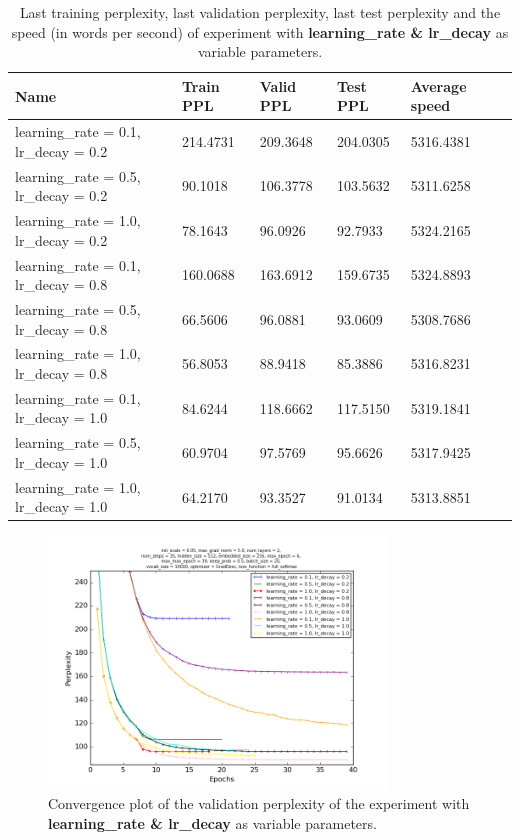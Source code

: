 \documentclass[10pt,a4paper,titlepage]{article}
\begin{document}
\begin{table}[H]
\centering
\caption{Last training perplexity, last validation perplexity, last test perplexity and the speed (in words per second) of experiment with \textbf{learning\_rate \& lr\_decay} as variable parameters.}
\label{tab:exp1data}
\begin{tabular}{|l|l|l|l|l|l|}
\hline
{\small Name} & {\small Train PPL} & {\small Valid PPL} & {\small Test PPL} & {\small Average speed}\\ \hline
{\small learning\_rate = 0.1, lr\_decay} = 0.2           & 214.4731   & 209.3648   & 204.0305   & 5316.4381  \\ \hline
{\small learning\_rate = 0.5, lr\_decay} = 0.2           & 90.1018    & 106.3778   & 103.5632   & 5311.6258  \\ \hline
{\small learning\_rate = 1.0, lr\_decay} = 0.2           & 78.1643    & 96.0926    & 92.7933    & 5324.2165  \\ \hline
{\small learning\_rate = 0.1, lr\_decay} = 0.8           & 160.0688   & 163.6912   & 159.6735   & 5324.8893  \\ \hline
{\small learning\_rate = 0.5, lr\_decay} = 0.8           & 66.5606    & 96.0881    & 93.0609    & 5308.7686  \\ \hline
{\small learning\_rate = 1.0, lr\_decay} = 0.8           & 56.8053    & 88.9418    & 85.3886    & 5316.8231  \\ \hline
{\small learning\_rate = 0.1, lr\_decay} = 1.0           & 84.6244    & 118.6662   & 117.5150   & 5319.1841  \\ \hline
{\small learning\_rate = 0.5, lr\_decay} = 1.0           & 60.9704    & 97.5769    & 95.6626    & 5317.9425  \\ \hline
{\small learning\_rate = 1.0, lr\_decay} = 1.0           & 64.2170    & 93.3527    & 91.0134    & 5313.8851  \\ \hline
\end{tabular}
\end{table}

\begin{figure}[H]
	\begin{center}
		\includegraphics[width=0.80\textwidth]{Figures/learninglrdecayperf.png}
		\caption{Convergence plot of the validation perplexity of the experiment with \textbf{learning\_rate \& lr\_decay} as variable parameters. }
		\label{fig:exp1perf}
	\end{center}	
\end{figure}
\end{document}
